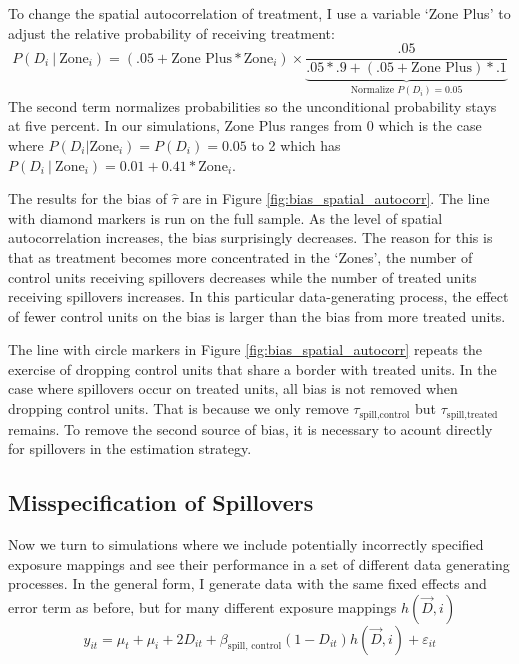 \documentclass[11pt]{article}
\begin{document}
To change the spatial autocorrelation of treatment, I use a variable `Zone Plus' to adjust the relative probability of receiving treatment: 
\begin{equation}
    \label{eq:cond_prob}
    P(D_i \ \vert \ \text{Zone}_i) = (.05 + \text{Zone Plus} * \text{Zone}_i) \times \underbrace{\frac{.05}{.05 * .9 + (.05 + \text{Zone Plus}) * .1}}_{\text{Normalize } P(D_i) = 0.05}
\end{equation}
The second term normalizes probabilities so the unconditional probability stays at five percent. In our simulations, Zone Plus ranges from 0 which is the case where $P(D_i \vert \text{Zone}_i) = P(D_i) = 0.05$ to 2 which has $P(D_i \ \vert \ \text{Zone}_i) = 0.01 + 0.41 * \text{Zone}_i$.

The results for the bias of $\hat{\tau}$ are in Figure \ref{fig:bias_spatial_autocorr}. The line with diamond markers is run on the full sample. As the level of spatial autocorrelation increases, the bias surprisingly decreases. The reason for this is that as treatment becomes more concentrated in the `Zones', the number of control units receiving spillovers decreases while the number of treated units receiving spillovers increases. In this particular data-generating process, the effect of fewer control units on the bias is larger than the bias from more treated units. 

The line with circle markers in Figure \ref{fig:bias_spatial_autocorr} repeats the exercise of dropping control units that share a border with treated units. In the case where spillovers occur on treated units, all bias is not removed when dropping control units. That is because we only remove $\tau_{\text{spill,control}}$ but $\tau_{\text{spill,treated}}$ remains. To remove the second source of bias, it is necessary to acount directly for spillovers in the estimation strategy. 


\subsection{Misspecification of Spillovers}

Now we turn to simulations where we include potentially incorrectly specified exposure mappings and see their performance in a set of different data generating processes. In the general form, I generate data with the same fixed effects and error term as before, but for many different exposure mappings $h(\vec{D}, i)$ 
\begin{equation}\label{eq:dgp_general}
    y_{it} = \mu_t + \mu_i + 2 D_{it} + \beta_{\text{spill, control}} (1-D_{it}) h(\vec{D}, i) + \varepsilon_{it}   
\end{equation}
\end{document}
